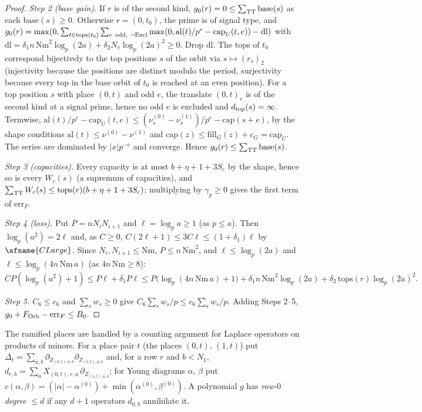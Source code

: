 \begin{proof}
\emph{Step 2 (base gain).} If $r$ is of the second kind, $g_0(r)=0\le\sum_{\rm TT}\mathrm{base}(s)$ as each $\mathrm{base}(s)\ge0$.
Otherwise $r=(0,t_0)$, the prime is of signal type, and
$g_0(r)=\max(0,\sum_{t\in\mathrm{tops}(t_0)}\sum_{e\ \rm odd,\ \neg\mathrm{Excl}}\max(0,\mathrm{al}(t)/p^e-\mathrm{cap}_U(t,e))-\mathrm{dl})$ with
$\mathrm{dl}=\delta_1n\,\mathrm{Nm}^2\log_p(2a)+\delta_2N_v\log_p(2a)^2\ge0$. Drop $\mathrm{dl}$. The tops of $t_0$ correspond
bijectively to the top positions $s$ of the orbit via $s\mapsto(r_s)_2$ (injectivity because the positions are distinct
modulo the period, surjectivity because every top in the base orbit of $t_0$ is reached at an even
position). For a top position $s$ with place $(0,t)$ and odd $e$, the translate $(0,t)_e$ is of the second kind at a signal
prime, hence no odd $e$ is excluded and $d_{\rm top}(s)=\infty$. Termwise,
$\mathrm{al}(t)/p^e-\mathrm{cap}_U(t,e)\le(\nu^{(0)}_s-\nu^{(1)}_s)/p^e-\mathrm{cap}(s+e)$, by the shape conditions
$\mathrm{al}(t)\le\nu^{(0)}-\nu^{(1)}$ and $\mathrm{cap}(z)\le\mathrm{fill}_G(z)+c_G=\mathrm{cap}_U$. The series are dominated by
$|x|p^{-e}$ and converge. Hence $g_0(r)\le\sum_{\rm TT}\mathrm{base}(s)$.

\emph{Step 3 (capacities).} Every capacity is at most $b+\eta+1+3S_c$ by the shape, hence so is every $W_c(s)$ (a supremum
of capacities), and $\sum_{\rm TT}W_c(s)\le\mathrm{tops}(r)(b+\eta+1+3S_c)$; multiplying by $\gamma_p\ge0$ gives the first
term of $\mathrm{err}_F$.

\emph{Step 4 (loss).} Put $P=nN_iN_{i+1}$ and $\ell=\log_pa\ge1$ (as $p\le a$). Then $\log_p(a^2)=2\ell$ and, as $C\ge0$,
$C(2\ell+1)\le3C\ell\le(1+\delta_1)\ell$ by $\sfname{CLarge}$. Since $N_i,N_{i+1}\le\mathrm{Nm}$, $P\le n\,\mathrm{Nm}^2$, and
$\ell\le\log_p(2a)$ and $\ell\le\log_p(4n\,\mathrm{Nm}\,a)$ (as $4n\,\mathrm{Nm}\ge8$):
\[
CP(\log_p(a^2)+1)\le P\ell+\delta_1P\ell\le P\bigl(\log_p(4n\,\mathrm{Nm}\,a)+1\bigr)+\delta_1n\,\mathrm{Nm}^2\log_p(2a)
+\delta_2\,\mathrm{tops}(r)\log_p(2a)^2 .
\]

\emph{Step 5.} $C_6\le c_6$ and $\sum_sw_s\ge0$ give $C_6\sum_sw_s/p\le c_6\sum_sw_s/p$. Adding Steps 2--5,
$g_0+F_{\rm Orb}-\mathrm{err}_F\le B_0$.
\end{proof}

The ramified places are handled by a counting argument for Laplace operators on products of minors. For a place pair
$t$ (the places $(0,t)$, $(1,t)$) put $\Delta_t=\sum_{a,b}\partial_{Z_{(0,t),a,b}}\partial_{Z_{(1,t),a,b}}$ and, for a row $r$ and
$b<N_1$, $d_{r,b}=\sum_aX_{(0,t),r,a}\,\partial_{Z_{(1,t),a,b}}$; for Young diagrams $\alpha$, $\beta$ put
$c(\alpha,\beta)=(|\alpha|-\alpha^{(0)})+\min(\alpha^{(0)},\beta^{(0)})$. A polynomial $g$ has \emph{row-$0$ degree} $\le d$ if
any $d+1$ operators $d_{0,b}$ annihilate it.

